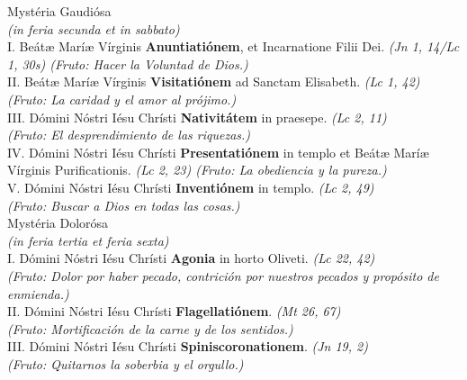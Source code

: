 \documentclass[letterpaper, landscape, 10pt, twocolumn]{article}
\begin{document}
  \Large {\color{red} Mystéria Gaudiósa}\\
  \normalsize {\color{red} \textit{(in feria secunda et in sabbato)}}\\
  {\color{red} I.} Beátæ Maríæ Vírginis \textbf{Anuntiatiónem}, et Incarnatione Filii Dei. {\color{red} \textit{(Jn 1, 14/Lc 1, 30s) (Fruto: Hacer la Voluntad de Dios.)}}\\
  {\color{red} II.} Beátæ Maríæ Vírginis \textbf{Visitatiónem} ad Sanctam Elisabeth. {\color{red} \textit{(Lc 1, 42)\\
  (Fruto: La caridad y el amor al prójimo.)}}\\
  {\color{red} III.} Dómini Nóstri Iésu Chrísti \textbf{Nativitátem} in praesepe. {\color{red} \textit{(Lc 2, 11)\\
  (Fruto: El desprendimiento de las riquezas.)}}\\
  {\color{red} IV.} Dómini Nóstri Iésu Chrísti \textbf{Presentatiónem} in templo et Beátæ Maríæ Vírginis Purificationis. {\color{red} \textit{(Lc 2, 23) (Fruto: La obediencia y la pureza.)}}\\
  V. Dómini Nóstri Iésu Chrísti \textbf{Inventiónem} in templo. {\color{red} \textit{(Lc 2, 49)\\
  (Fruto: Buscar a Dios en todas las cosas.)}}\\

  \Large {\color{red} Mystéria Dolorósa}\\
  \normalsize {\color{red} \textit{(in feria tertia et feria sexta)}}\\
  {\color{red} I.} Dómini Nóstri Iésu Chrísti \textbf{Agonia} in horto Oliveti. {\color{red} \textit{(Lc 22, 42)\\
  (Fruto: Dolor por haber pecado, contrición por nuestros pecados y propósito de enmienda.)}}\\
  {\color{red} II.} Dómini Nóstri Iésu Chrísti \textbf{Flagellatiónem}. {\color{red} \textit{(Mt 26, 67)\\
  (Fruto: Mortificación de la carne y de los sentidos.)}}\\
  {\color{red} III.} Dómini Nóstri Iésu Chrísti \textbf{Spiniscoronationem}. {\color{red} \textit{(Jn 19, 2)\\
  (Fruto: Quitarnos la soberbia y el orgullo.)}}\\
\end{document}
